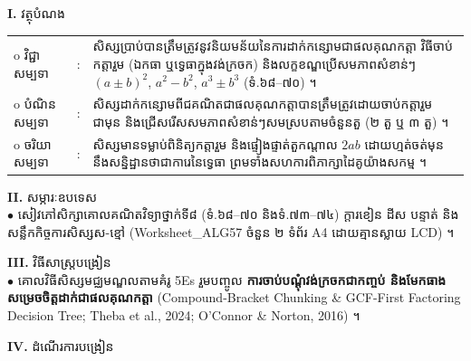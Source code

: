 \documentclass[a4paper,10pt]{article}
\newcommand{\wcirc}{{\CourierBullet\fontsize{9.5pt}{11pt}\selectfont o}}
\newcommand{\en}[1]{{\TimesEn #1}}
\begin{document}
\textbf{I.} {\muol វត្ថុបំណង}\\[1pt]
\hspace*{0.55cm}%
\begin{tabular}{@{}l l L{14.2cm}@{}}
  \wcirc \hspace{0.25cm} វិជ្ជាសម្បទា & : & សិស្សប្រាប់បានត្រឹមត្រូវនូវនិយមន័យនៃការដាក់កន្សោមជាផលគុណកត្តា វិធីចាប់កត្តារួម (ឯកធា ឬទ្វេធាក្នុងវង់ក្រចក) និងលក្ខខណ្ឌប្រើសមភាពសំខាន់ៗ $(a\pm b)^2$, $a^2-b^2$, $a^3\pm b^3$ (ទំ.៦៨--៧០) ។ \\
  \wcirc \hspace{0.25cm} បំណិនសម្បទា & : & សិស្សដាក់កន្សោមពីជគណិតជាផលគុណកត្តាបានត្រឹមត្រូវដោយចាប់កត្តារួមជាមុន និងជ្រើសរើសសមភាពសំខាន់ៗសមស្របតាមចំនួនតួ (២ តួ ឬ ៣ តួ) ។ \\
  \wcirc \hspace{0.25cm} ចរិយាសម្បទា & : & សិស្សមានទម្លាប់ពិនិត្យកត្តារួម និងផ្ទៀងផ្ទាត់តួកណ្ដាល $2ab$ ដោយហ្មត់ចត់មុននឹងសន្និដ្ឋានថាជាការេនៃទ្វេធា ព្រមទាំងសហការពិភាក្សាដៃគូយ៉ាងសកម្ម ។ \\
\end{tabular}

\vspace{1pt}

\textbf{II.} {\muol សម្ភារៈឧបទេស}\\[1pt]
\hspace*{0.55cm}$\bullet$ \hspace{0.35cm} សៀវភៅសិក្សាគោលគណិតវិទ្យាថ្នាក់ទី៨ (ទំ.៦៨--៧០ និងទំ.៧៣--៧៤) ក្ដារខៀន ដីស បន្ទាត់ និងសន្លឹកកិច្ចការសិស្សស-ខ្មៅ (\en{Worksheet\_ALG57} ចំនួន ២ ទំព័រ \en{A4} ដោយគ្មានស្លាយ \en{LCD}) ។

\vspace{1pt}

\textbf{III.} {\muol វិធីសាស្រ្តបង្រៀន}\\[1pt]
\hspace*{0.55cm}$\bullet$ \hspace{0.35cm} គោលវិធីសិស្សមជ្ឈមណ្ឌលតាមគំរូ \en{5Es} រួមបញ្ចូល \textbf{ការចាប់បណ្ដុំវង់ក្រចកជាកញ្ចប់ និងមែកធាងសម្រេចចិត្តដាក់ជាផលគុណកត្តា} (\en{Compound-Bracket Chunking \& GCF-First Factoring Decision Tree}; \en{Theba et al., 2024; O'Connor \& Norton, 2016}) ។

\vspace{2pt}

\textbf{IV.} {\muol ដំណើរការបង្រៀន}\\[-6pt]
\end{document}

